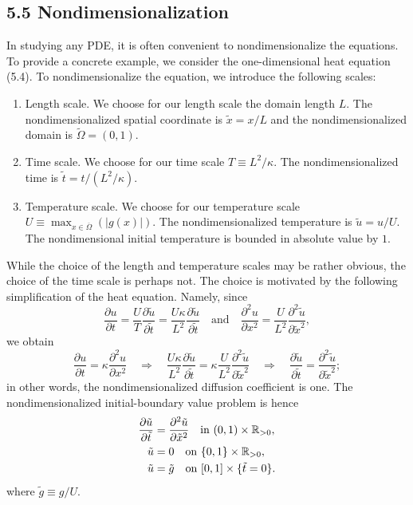\subsection{5.5 Nondimensionalization}
In studying any PDE, it is often convenient to nondimensionalize the equations. To provide a concrete example, we consider the one-dimensional heat equation (5.4). To nondimensionalize the equation, we introduce the following scales:
\begin{enumerate}
    \item Length scale. We choose for our length scale the domain length $L$. The nondimensionalized spatial coordinate is $\tilde{x} = x/L$ and the nondimensionalized domain is $\tilde{\Omega} = (0, 1)$.
    \item Time scale. We choose for our time scale $T \equiv L^2/\kappa$. The nondimensionalized time is $\tilde{t} = t/(L^2/\kappa)$.
    \item Temperature scale. We choose for our temperature scale $U \equiv \max_{x \in \overline{\Omega}} (|g(x)|)$. The nondimensionalized temperature is $\tilde{u} = u/U$. The nondimensional initial temperature is bounded in absolute value by $1$.
\end{enumerate}
While the choice of the length and temperature scales may be rather obvious, the choice of the time scale is perhaps not. The choice is motivated by the following simplification of the heat equation. Namely, since
\[\frac{\partial u}{\partial t} = \frac{U}{T} \frac{\partial \tilde{u}}{\partial \tilde{t}} = \frac{U\kappa}{L^2} \frac{\partial \tilde{u}}{\partial \tilde{t}} \quad \text{and} \quad \frac{\partial^2 u}{\partial x^2} = \frac{U}{L^2} \frac{\partial^2 \tilde{u}}{\partial \tilde{x}^2},\]
we obtain
\[\frac{\partial u}{\partial t} = \kappa \frac{\partial^2 u}{\partial x^2} \quad \Rightarrow \quad \frac{U\kappa}{L^2} \frac{\partial \tilde{u}}{\partial \tilde{t}} = \kappa \frac{U}{L^2} \frac{\partial^2 \tilde{u}}{\partial \tilde{x}^2} \quad \Rightarrow \quad \frac{\partial \tilde{u}}{\partial \tilde{t}} = \frac{\partial^2 \tilde{u}}{\partial \tilde{x}^2};\]
in other words, the nondimensionalized diffusion coefficient is one. The nondimensionalized initial-boundary value problem is hence
\begin{align*}
    \frac{\partial \tilde{u}}{\partial \tilde{t}} &= \frac{\partial^2 \tilde{u}}{\partial \tilde{x}^2} \quad \text{in } (0, 1) \times \mathbb{R}_{>0}, \\
    \tilde{u} &= 0 \quad \text{on } \{0, 1\} \times \mathbb{R}_{>0}, \\
    \tilde{u} &= \tilde{g} \quad \text{on } [0, 1] \times \{\tilde{t} = 0\}.
\end{align*}
where $\tilde{g} \equiv g/U$.

